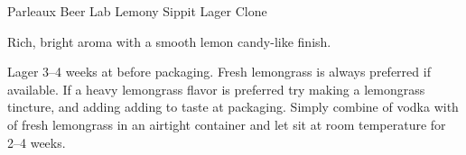 \stylesection{\styleamericanlager}

\begin{recipe}{Parleaux Beer Lab Lemony Sippit Lager Clone}

\begin{aboutblock}
Rich, bright aroma with a smooth lemon candy-like finish. \sourceaha
\end{aboutblock}


\begin{methodandtiming}
  
\begin{mashsteps}
\end{mashsteps}

\begin{fermentationsteps}
\end{fermentationsteps}

\begin{directions}
Lager 3--4 weeks at  before packaging. Fresh lemongrass is always
preferred if available. If a heavy lemongrass flavor is preferred try making
a lemongrass tincture, and adding adding to taste at packaging. Simply combine
 of vodka with  of fresh lemongrass in an airtight container
and let sit at room temperature for 2--4 weeks.
\end{directions}

\end{methodandtiming}

\recipebreak

\begin{ingredientsblock}

\begin{malts}
\end{malts}

\begin{hops}
\end{hops}


\end{ingredientsblock}

\end{recipe}

